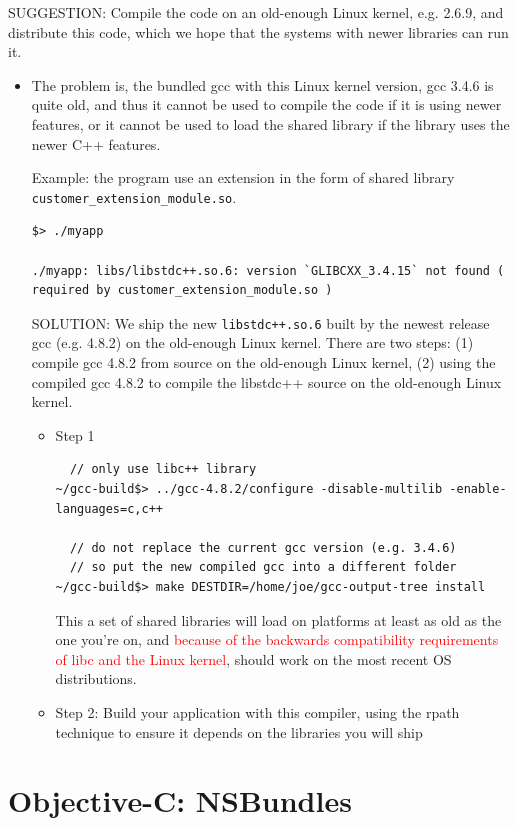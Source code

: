 SUGGESTION: Compile the code on an old-enough Linux kernel, e.g. 2.6.9, and
distribute this code, which we hope that the systems with newer libraries can
run it. 
\begin{itemize}
  \item The problem is, the bundled gcc with this Linux kernel version, gcc
3.4.6 is quite old, and thus it cannot be used to compile the code if it is
using newer features, or it cannot be used to load the shared library if the
library uses the newer C++ features.

Example: the program use an extension in the form of shared library
\verb!customer_extension_module.so!.
\begin{verbatim}
$> ./myapp  

./myapp: libs/libstdc++.so.6: version `GLIBCXX_3.4.15` not found ( required by customer_extension_module.so )
\end{verbatim}  

SOLUTION: We ship the new \verb!libstdc++.so.6! built by the newest release gcc (e.g. 4.8.2)
on the old-enough Linux kernel. There are two steps: (1) compile gcc 4.8.2 from source 
on the old-enough Linux kernel, (2) using the compiled gcc 4.8.2 to compile the libstdc++ source
on the old-enough Linux kernel.
\begin{itemize}
  \item Step 1

\begin{verbatim}
  // only use libc++ library
~/gcc-build$> ../gcc-4.8.2/configure -disable-multilib -enable-languages=c,c++

  // do not replace the current gcc version (e.g. 3.4.6)
  // so put the new compiled gcc into a different folder
~/gcc-build$> make DESTDIR=/home/joe/gcc-output-tree install  
\end{verbatim}

This a set of shared libraries will load on platforms at least as old as the one
you're on, and \textcolor{red}{because of the backwards compatibility
requirements of libc and the Linux kernel}, should work on the most recent OS
distributions.

  \item Step 2: Build your application with this compiler, using the rpath
  technique to ensure it depends on the libraries you will ship
  
\end{itemize}
\end{itemize}

\section{Objective-C: NSBundles}


